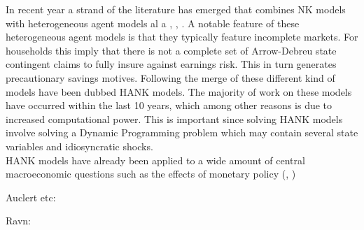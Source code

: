 In recent year a strand of the literature has emerged that combines NK models with heterogeneous agent models al a \citet{bewley1986stationary}, \citet{aiyagari1994uninsured}, \citet{krusell1998income}. A notable feature of these heterogeneous agent models is that they typically feature incomplete markets. For households this imply that there is not a complete set of Arrow-Debreu state contingent claims to fully insure against earnings risk. This in turn generates precautionary savings motives. Following \citet{kaplan2018monetary} the merge of these different kind of models have been dubbed HANK models. The majority of work on these models have occurred within the last 10 years, which among other reasons is due to increased computational power. This is important since solving HANK models involve solving a Dynamic Programming problem which may contain several state variables and idiosyncratic shocks. \\
 
HANK models have already been applied to a wide amount of central macroeconomic questions such as the effects of monetary policy (\citet{kaplan2018monetary},  \citet{auclert2020micro})

Auclert etc: 
\citet{auclert2018inequality} %
\citet{auclert2019using} %
\citet{auclert2018intertemporal} %
\citet{auclert2020micro} %


Ravn: 
\citet{ravn2016macroeconomic} %


 
 